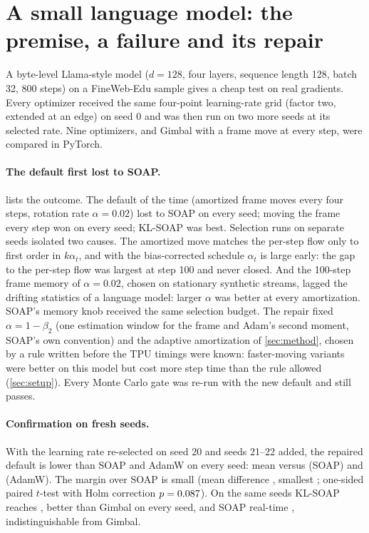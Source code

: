 \section{A small language model: the premise, a failure and its repair}
\label{sec:smalllm}

A byte-level Llama-style model ($d=128$, four layers, sequence length 128, batch 32, 800 steps) on a
FineWeb-Edu sample gives a cheap test on real gradients. Every optimizer received the same
four-point learning-rate grid (factor two, extended at an edge) on seed 0 and was then run on two
more seeds at its selected rate. Nine optimizers, and Gimbal with a frame move at every step,
were compared in PyTorch.

\paragraph{The default first lost to SOAP.}  lists the outcome. The default of the
time (amortized frame moves every four steps, rotation rate $\alpha=0.02$) lost to SOAP on every seed;
moving the frame every step won on every seed; KL-SOAP was best. Selection runs on separate seeds
isolated two causes. The amortized move matches the per-step flow only to first order in
$k\alpha_t$, and with the bias-corrected schedule $\alpha_t$ is large early: the gap to the per-step flow
was largest at step 100 and never closed. And the 100-step frame memory of $\alpha=0.02$, chosen on
stationary synthetic streams, lagged the drifting statistics of a language model: larger $\alpha$ was
better at every amortization. SOAP's memory knob received the same selection budget. The repair
fixed $\alpha=1-\beta_2$ (one estimation window for the frame and Adam's second moment, SOAP's own
convention) and the adaptive amortization of \cref{sec:method}, chosen by a rule written before the
TPU timings were known: faster-moving variants were better on this model but cost more step time
than the rule allowed (\cref{sec:setup}). Every Monte Carlo gate was re-run with the new default
and still passes.

\paragraph{Confirmation on fresh seeds.} With the learning rate re-selected on seed 20 and seeds
21--22 added, the repaired default is lower than SOAP and AdamW on every seed: mean
\GthreeFiveGimbal{} versus \GthreeFiveSoap{} (SOAP) and \GthreeFiveAdamw{} (AdamW). The margin over
SOAP is small (mean difference \GthreeFiveDiffSoap{}, smallest \GthreeFiveDiffSoapMin{}; one-sided
paired $t$-test with Holm correction $p=0.087$). On the same seeds KL-SOAP reaches
\KillKlsoap{}, better than Gimbal on every seed, and SOAP real-time \KillSoapRt{}, indistinguishable
from Gimbal.

